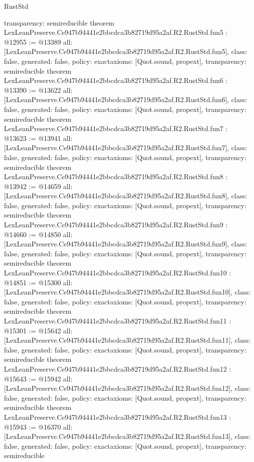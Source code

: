 \begin{lexlean}{RustStd}
\begin{coremodule}
{  transparency: semireducible
}
theorem LexLeanPreserve.Ce947b94441e2bbcdca3b82719d95a2af.R2.RustStd.fun5 : @12955 := @13389 {
  all: [LexLeanPreserve.Ce947b94441e2bbcdca3b82719d95a2af.R2.RustStd.fun5],
  class: false,
  generated: false,
  policy: exact{axioms: [Quot.sound, propext]},
  transparency: semireducible
}
theorem LexLeanPreserve.Ce947b94441e2bbcdca3b82719d95a2af.R2.RustStd.fun6 : @13390 := @13622 {
  all: [LexLeanPreserve.Ce947b94441e2bbcdca3b82719d95a2af.R2.RustStd.fun6],
  class: false,
  generated: false,
  policy: exact{axioms: [Quot.sound, propext]},
  transparency: semireducible
}
theorem LexLeanPreserve.Ce947b94441e2bbcdca3b82719d95a2af.R2.RustStd.fun7 : @13623 := @13941 {
  all: [LexLeanPreserve.Ce947b94441e2bbcdca3b82719d95a2af.R2.RustStd.fun7],
  class: false,
  generated: false,
  policy: exact{axioms: [Quot.sound, propext]},
  transparency: semireducible
}
theorem LexLeanPreserve.Ce947b94441e2bbcdca3b82719d95a2af.R2.RustStd.fun8 : @13942 := @14659 {
  all: [LexLeanPreserve.Ce947b94441e2bbcdca3b82719d95a2af.R2.RustStd.fun8],
  class: false,
  generated: false,
  policy: exact{axioms: [Quot.sound, propext]},
  transparency: semireducible
}
theorem LexLeanPreserve.Ce947b94441e2bbcdca3b82719d95a2af.R2.RustStd.fun9 : @14660 := @14850 {
  all: [LexLeanPreserve.Ce947b94441e2bbcdca3b82719d95a2af.R2.RustStd.fun9],
  class: false,
  generated: false,
  policy: exact{axioms: [Quot.sound, propext]},
  transparency: semireducible
}
theorem LexLeanPreserve.Ce947b94441e2bbcdca3b82719d95a2af.R2.RustStd.fun10 : @14851 := @15300 {
  all: [LexLeanPreserve.Ce947b94441e2bbcdca3b82719d95a2af.R2.RustStd.fun10],
  class: false,
  generated: false,
  policy: exact{axioms: [Quot.sound, propext]},
  transparency: semireducible
}
theorem LexLeanPreserve.Ce947b94441e2bbcdca3b82719d95a2af.R2.RustStd.fun11 : @15301 := @15642 {
  all: [LexLeanPreserve.Ce947b94441e2bbcdca3b82719d95a2af.R2.RustStd.fun11],
  class: false,
  generated: false,
  policy: exact{axioms: [Quot.sound, propext]},
  transparency: semireducible
}
theorem LexLeanPreserve.Ce947b94441e2bbcdca3b82719d95a2af.R2.RustStd.fun12 : @15643 := @15942 {
  all: [LexLeanPreserve.Ce947b94441e2bbcdca3b82719d95a2af.R2.RustStd.fun12],
  class: false,
  generated: false,
  policy: exact{axioms: [Quot.sound, propext]},
  transparency: semireducible
}
theorem LexLeanPreserve.Ce947b94441e2bbcdca3b82719d95a2af.R2.RustStd.fun13 : @15943 := @16370 {
  all: [LexLeanPreserve.Ce947b94441e2bbcdca3b82719d95a2af.R2.RustStd.fun13],
  class: false,
  generated: false,
  policy: exact{axioms: [Quot.sound, propext]},
  transparency: semireducible
}
\end{coremodule}
\end{lexlean}
